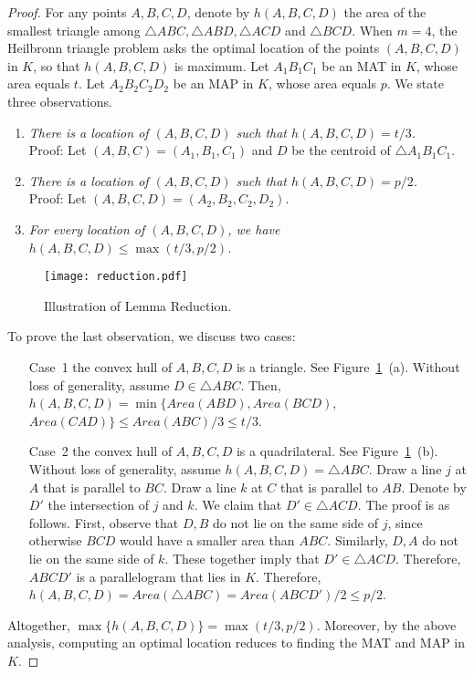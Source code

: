 \documentclass{ws-ijcga}
\begin{document}
\begin{proof}
For any points $A,B,C,D$, denote by $h(A,B,C,D)$ the area of the smallest triangle among $\triangle ABC,\triangle ABD,\triangle ACD$ and $\triangle BCD$.
When $m=4$, the Heilbronn triangle problem asks the optimal location of the points $(A,B,C,D)$ in $K$, so that $h(A,B,C,D)$ is maximum.
Let $A_1B_1C_1$ be an MAT in $K$, whose area equals $t$.
  Let $A_2B_2C_2D_2$ be an MAP in $K$, whose area equals $p$.
  We state three observations.
\begin{enumerate}
\item \emph{There is a location of $(A,B,C,D)$ such that $h(A,B,C,D)=t/3$.}\\
    Proof: Let $(A,B,C)=(A_1,B_1,C_1)$ and $D$ be the centroid of $\triangle A_1B_1C_1$.\smallskip
\item \emph{There is a location of $(A,B,C,D)$ such that $h(A,B,C,D)=p/2$.}\\
    Proof: Let $(A,B,C,D)=(A_2,B_2,C_2,D_2)$. \smallskip
\item \emph{For every location of $(A,B,C,D)$, we have $h(A,B,C,D)\leq \max (t/3,p/2)$.}
\end{enumerate}

\begin{figure}[h]
    \centering \texttt{[image: reduction.pdf]}
    \caption{Illustration of Lemma Reduction.}\label{fig:reduction}
\end{figure}

To prove the last observation, we discuss two cases:
\begin{enumerate}
\item[Case~1] the convex hull of $A,B,C,D$ is a triangle. See Figure~\ref{fig:reduction}~(a).
    Without loss of generality, assume $D\in \triangle ABC$.
   Then, $h(A,B,C,D)=\min\{Area(ABD), Area(BCD)$, $Area(CAD)\}\leq Area(ABC)/3 \leq t/3$.
\item[Case~2] the convex hull of $A,B,C,D$ is a quadrilateral. See Figure~\ref{fig:reduction}~(b).
    Without loss of generality, assume $h(A,B,C,D)=\triangle ABC$.
  Draw a line $j$ at $A$ that is parallel to $BC$. Draw a line $k$ at $C$ that is parallel to $AB$.
    Denote by $D'$ the intersection of $j$ and $k$.  We claim that  $D'\in \triangle ACD$.
        The proof is as follows. First, observe that $D,B$ do not lie on the same side of $j$, since otherwise $BCD$ would have a smaller area than $ABC$.
	Similarly, $D,A$ do not lie on the same side of $k$. These together imply that $D'\in \triangle ACD$.
    Therefore, $ABCD'$ is a parallelogram that lies in $K$.
    Therefore, $h(A,B,C,D)=Area(\triangle ABC)=Area(ABCD')/2\leq p/2$.
\end{enumerate}

Altogether, $\max\{h(A,B,C,D)\}=\max(t/3,p/2)$. Moreover, by the above analysis, computing an optimal location reduces to finding the MAT and MAP in $K$.
\end{proof}
\end{document}
